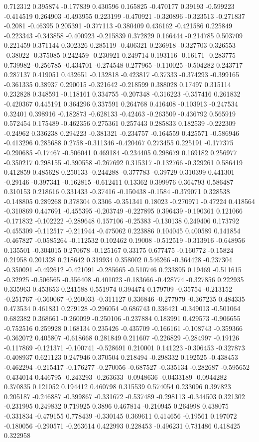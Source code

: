 0.712312 0.395874 -0.177839 0.430596 0.165825 -0.470177 0.39193 -0.599223 -0.414519 0.264903 -0.493955 0.223199 -0.470921 -0.320896 -0.323513 -0.271837 -0.2081 -0.46395 0.205391 -0.377113 -0.380409 0.436162 -0.421586 0.225849 -0.223343 -0.343858 -0.400923 -0.215839 0.372829 0.166444 -0.214785 0.503709 0.221459 0.371144 0.302326 0.285119 -0.406321 0.236918 -0.327703 0.326553 -0.38022 -0.375085 0.242459 -0.230921 0.249714 0.193116 -0.16171 -0.283775 0.739982 -0.256785 -0.434701 -0.274548 0.277965 -0.110025 -0.504282 0.243717 0.287137 0.419051 0.432651 -0.132818 -0.423817 -0.37333 -0.374293 -0.399165 -0.361335 0.38937 0.290015 -0.321642 -0.218599 0.388028 0.17497 0.315114 0.232828 0.348591 -0.118161 0.334755 -0.207348 -0.316223 -0.357416 0.261832 -0.420367 0.445191 0.364296 0.337591 0.264768 0.416408 -0.103913 -0.247534 0.32401 0.398916 -0.182873 -0.628133 -0.42463 -0.263509 -0.436792 0.565919 0.572454 0.175489 -0.462356 0.275361 0.257443 0.285833 0.182539 -0.222309 -0.24962 0.336238 0.294223 -0.381321 -0.234757 -0.164559 0.425571 -0.586946 -0.413296 0.285688 0.2758 -0.311346 -0.420467 0.273455 0.225191 -0.177375 -0.290685 -0.17467 -0.506041 0.469184 -0.234405 0.298679 0.169182 0.256977 -0.350217 0.298155 -0.390558 -0.267692 0.315317 -0.132766 -0.329261 0.586419 0.412859 0.485628 0.250133 -0.244288 -0.377783 -0.39729 0.310399 0.441301 -0.29146 -0.397341 -0.162815 -0.612411 0.13362 0.399976 0.364793 0.586487 0.310153 0.218616 0.331433 -0.37416 -0.150438 -0.1584 -0.379071 0.328538 -0.148805 0.289268 0.378304 0.3306 -0.351341 0.18023 -0.270971 -0.47224 0.418564 -0.310869 0.447691 -0.455395 -0.203749 -0.227895 0.396439 -0.190361 0.121066 -0.171832 -0.102222 -0.289648 0.157106 -0.25383 -0.130138 0.249406 0.173792 -0.455309 -0.112517 -0.211944 -0.475062 0.223886 0.104045 0.400589 0.141854 -0.467827 -0.0585264 -0.112532 0.102462 0.19008 -0.512519 -0.313916 -0.648956 0.135501 -0.304015 0.270678 -0.125167 0.33175 0.677475 -0.160772 -0.15824 0.21958 0.201328 0.218642 0.319934 0.358002 0.546266 -0.364428 -0.237304 -0.350091 -0.492612 -0.421091 -0.285665 -0.510746 0.233895 0.19469 -0.511615 -0.32925 -0.506565 -0.356408 -0.401023 -0.183666 -0.428774 -0.327856 0.222935 0.335963 0.453653 0.241588 0.551974 0.394474 0.179709 -0.35754 -0.213152 -0.251767 -0.360067 -0.260033 -0.311127 0.336846 -0.277979 -0.367235 0.484335 0.473534 0.461831 0.279128 -0.296054 -0.686743 0.336421 -0.349013 -0.501064 0.682382 0.368661 -0.260099 -0.250106 -0.237884 0.183991 0.429573 -0.906655 -0.752516 0.259928 0.168134 0.235426 -0.435709 -0.166161 -0.108743 -0.359366 -0.362072 0.405807 -0.618668 0.281849 0.211607 -0.226829 -0.284997 -0.19126 -0.117869 -0.121371 -0.100741 -0.528691 0.210001 0.141223 -0.306453 -0.327873 -0.408937 0.621123 0.247946 0.370504 0.218494 -0.298332 0.192525 -0.438453 -0.462294 -0.215417 -0.176277 -0.270056 -0.687527 -0.335134 -0.282687 -0.595652 -0.434014 0.446795 -0.243293 -0.263633 -0.0948636 -0.0433189 -0.0944282 0.370835 0.121052 0.194412 0.460798 0.315539 0.574054 0.233096 0.397823 0.205187 -0.246887 -0.399867 -0.331672 -0.537489 -0.298113 -0.344503 0.321302 -0.231995 0.249832 0.719925 0.3896 0.467814 -0.210945 0.264998 0.438075 -0.331834 -0.479155 0.778439 -0.330145 0.369611 0.414656 -0.19561 0.197072 -0.180056 -0.290571 -0.263614 0.422993 0.228453 -0.496231 0.731486 0.418425 0.322958 